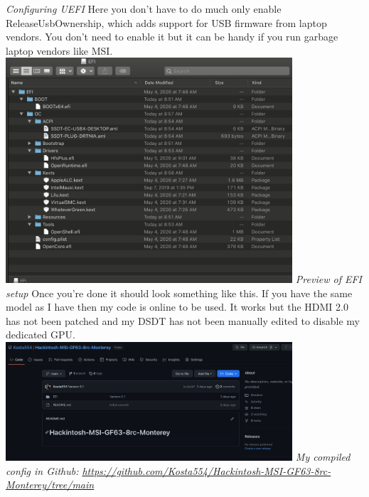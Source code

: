 \documentclass[12pt, letterpaper]{article}
\begin{document}
\break
\emph{Configuring UEFI}
\hfill\break
\hfill\break
Here you don't have to do much only enable ReleaseUsbOwnership, which adds support for USB firmware from laptop vendors. You don't need to enable it but it can be handy if you run garbage laptop vendors like MSI.
\hfill\break
\hfill\break
\includegraphics[width=0.8\textwidth]{fotos/PSP/Propertree/Efi preview.jpeg}
\break
\emph{Preview of EFI setup}
\hfill\break
\hfill\break
Once you're done it should look something like this. If you have the same model as I have then my code is online to be used. It works but the HDMI 2.0 has not been patched and my DSDT has not been manually edited to disable my dedicated GPU.
\hfill\break
\hfill\break
\includegraphics[width=0.8\textwidth]{fotos/PSP/My github.jpeg}
\break
\emph{My compiled config in Github: \url{https://github.com/Kosta554/Hackintosh-MSI-GF63-8rc-Monterey/tree/main}}
\hfill\break
\hfill\break
\end{document}
